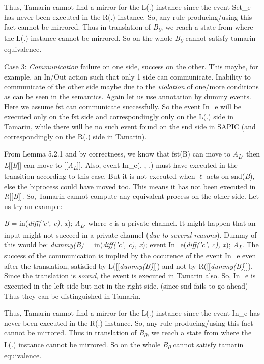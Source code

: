 \documentclass[11pt]{article}
\begin{document}
Thus, Tamarin cannot find a mirror for the L(.) instance since the event Set\_e has never been executed in the R(.) instance. So, any rule producing/using this fact cannot be mirrored. Thus in translation of {\it B\textsubscript{0}}, we reach a state from where the L(.) instance cannot be mirrored. So on the whole {\it B\textsubscript{0}} cannot satisfy tamarin equivalence.\newline

\underline{Case 3}: {\it Communication} failure on one side, success on the other. This maybe, for example, an In/Out action such that only 1 side can communicate. Inability to communicate of the other side maybe due to the {\it violation} of one/more conditions as can be seen in the semantics. Again let us use annotation by dummy events. Here we assume fst can communicate successfully. So the event In\_e will be executed only on the fst side and correspondingly only on the L(.) side in Tamarin, while there will be no such event found on the snd side in SAPIC (and correspondingly on the R(.) side in Tamarin).

From Lemma 5.2.1 and by correctness, we know that fst(B) can move to {\it A\textsubscript{L}}, then {\it L}[[{\it B}]] can move to [[{\it A\textsubscript{L}}]]. Also, event In\_e(. , .) must have executed in the transition according to this case. But it is not executed when $\ell$ acts on snd({\it B}), else the biprocess could have moved too. This means it has not been executed in {\it R}[[{\it B}]]. So, Tamarin cannot compute any equivalent process on the other side. Let us try an example:

{\it B} = in({\it diff('c', c), x}); {\it A\textsubscript{L}}, where {\it c} is a private channel. It might happen that an input might not succeed in a private channel ({\it due to several reasons}). Dummy of this would be: {\it dummy(B)} = in({\it diff('c', c), x}); event In\_e({\it diff('c', c), x}); {\it A\textsubscript{L}}. The success of the communication is implied by the occurence of the event In\_e even after the translation, satisfied by L([[{\it dummy(B)}]]) and not by R([[{\it dummy(B)}]]). Since the translation is {\it sound}, the event is executed in Tamarin also. So, In\_e is executed in the left side but not in the right side. (since snd fails to go ahead) Thus they can be distinguished in Tamarin. 

Thus, Tamarin cannot find a mirror for the L(.) instance since the event In\_e has never been executed in the R(.) instance. So, any rule producing/using this fact cannot be mirrored. Thus in translation of {\it B\textsubscript{0}}, we reach a state from where the L(.) instance cannot be mirrored. So on the whole {\it B\textsubscript{0}} cannot satisfy tamarin equivalence.\newline
\end{document}

